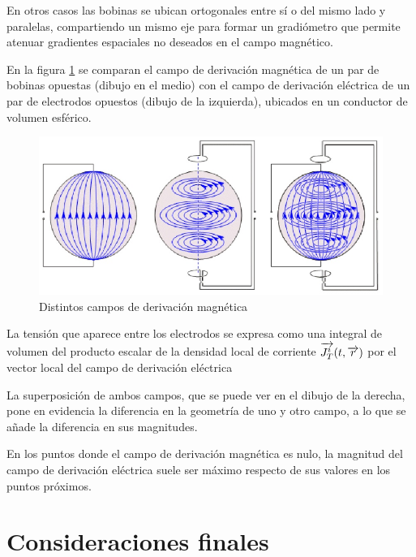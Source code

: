 En otros casos las bobinas se ubican ortogonales entre sí o del mismo lado y paralelas, compartiendo un mismo eje para formar un gradiómetro que permite atenuar gradientes espaciales no deseados en el campo magnético.

En la figura \ref{fig:619} se comparan el campo de derivación magnética de un par de bobinas opuestas (dibujo en el medio) con el campo de derivación eléctrica de un par de electrodos opuestos (dibujo de la izquierda), ubicados en un conductor de volumen esférico.


\begin{figure}[H]
    \centering
    \includegraphics[width=1.0\textwidth]{./Figures/fig619}
	\caption{Distintos campos de derivación magnética}
	\label{fig:619}
\end{figure}

La tensión que aparece entre los electrodos se expresa como una integral de volumen del producto escalar de la densidad local de corriente $\overrightarrow{J^{i}_{T}}(t, \overrightarrow{r})$ por el vector local del campo de derivación eléctrica \cite{Malmivuo_1995} %

La superposición de ambos campos, que se puede ver en el dibujo de la derecha, pone en evidencia la diferencia en la geometría de uno y otro campo, a lo que se añade la diferencia en sus magnitudes.

En los puntos donde el campo de derivación magnética es nulo, la magnitud del campo de derivación eléctrica suele ser máximo respecto de sus valores en los puntos próximos.

\section{Consideraciones finales}

